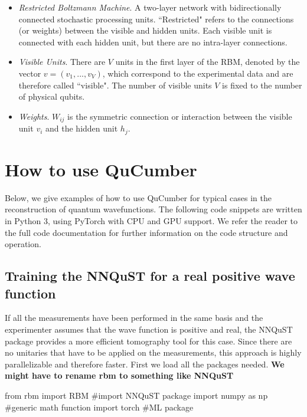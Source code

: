 \documentclass[submission, Phys]{SciPost}
\begin{document}
\begin{itemize}
\item {\it Restricted Boltzmann Machine}.  A two-layer network with bidirectionally connected stochastic processing units.  ``Restricted" refers to the connections (or weights) between the visible and hidden units. Each visible unit is connected with each hidden unit, but there are no intra-layer connections.

\item {\it Visible Units}.  There are $V$ units in the first layer of the RBM, denoted by the vector $v=(v_1, ..., v_V)$, which correspond to the experimental data and are therefore called ``visible".  The number of visible units $V$ is fixed to the number of physical qubits.

\item {\it Weights}.  $W_{ij}$ is the symmetric connection or interaction between the visible unit $v_i$ and the hidden unit $h_j$.

\end{itemize}



\section{How to use QuCumber}

Below, we give examples of how to use QuCumber for typical cases in the reconstruction of quantum wavefunctions.  The following code snippets are written in Python 3, using PyTorch with CPU and GPU support.  We refer the reader to the full code documentation for further information on the code structure and operation.

\subsection{Training the NNQuST for a real positive wave function}

If all the measurements have been performed in the same basis and the experimenter assumes that the wave function is positive and real, the NNQuST package provides a more efficient tomography tool for this case. Since there are no unitaries that have to be applied on the measurements, this approach is highly parallelizable  and therefore faster.
First we load all the packages needed. \textbf{We might have to rename rbm to something like NNQuST} 

\begin{python}
from rbm import RBM #import NNQuST package
import numpy as np #generic math function
import torch #ML package
\end{python}
\end{document}
